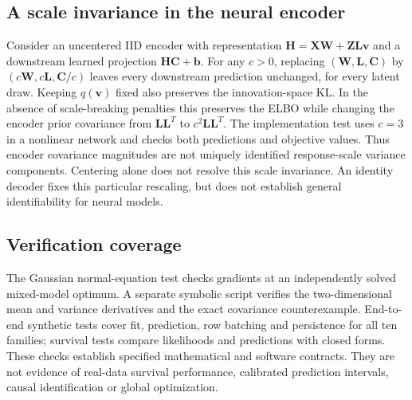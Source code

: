 \subsection{A scale invariance in the neural encoder}
\label{app:scale}
Consider an uncentered IID encoder with representation
$\mathbf H=\mathbf X\mathbf W+\mathbf Z\mathbf L\mathbf v$ and a downstream
learned projection $\mathbf H\mathbf C+\mathbf b$. For any $c>0$, replacing
$(\mathbf W,\mathbf L,\mathbf C)$ by
$(c\mathbf W,c\mathbf L,\mathbf C/c)$ leaves every downstream prediction
unchanged, for every latent draw. Keeping $q(\mathbf v)$ fixed also preserves
the innovation-space KL. In the absence of scale-breaking penalties this
preserves the ELBO while changing the encoder prior covariance from
$\mathbf L\mathbf L^T$ to $c^2\mathbf L\mathbf L^T$.
The implementation test uses $c=3$ in a nonlinear network and checks both
predictions and objective values. Thus encoder covariance magnitudes are not
uniquely identified response-scale variance components. Centering alone does
not resolve this scale invariance. An identity decoder fixes this particular
rescaling, but does not establish general identifiability for neural models.

\subsection{Verification coverage}
The Gaussian normal-equation test checks gradients at an independently solved
mixed-model optimum. A separate symbolic script verifies the two-dimensional
mean and variance derivatives and the exact covariance counterexample.
End-to-end synthetic tests cover fit, prediction, row batching and persistence
for all ten families; survival tests compare likelihoods and predictions with
closed forms. These checks establish specified mathematical and software
contracts. They are not evidence of real-data survival performance, calibrated
prediction intervals, causal identification or global optimization.
